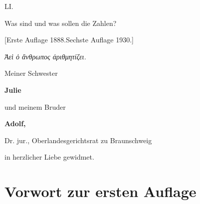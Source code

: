\documentclass[11pt]{article}
\begin{document}
\begin{center}
{\Large LI.}\par\vspace{0.4em}
{\LARGE Was sind und was sollen die Zahlen?}\par
{[Erste Auflage 1888.\quad Sechste Auflage 1930.]}\par\vspace{0.8em}
{\itshape Ἀεὶ ὁ ἄνθρωπος ἀριθμητίζει.}\par
\vspace{1.5em}
Meiner Schwester\par
{\bfseries Julie}\par
und meinem Bruder\par
{\bfseries Adolf,}\par
Dr. jur., Oberlandesgerichtsrat zu Braunschweig\par
in herzlicher Liebe gewidmet.
\end{center}

\section*{Vorwort zur ersten Auflage}
\end{document}
